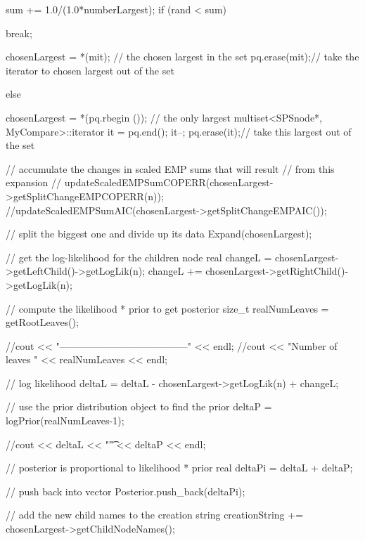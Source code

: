 \begin{DoxyCode}
{{{{{                    sum += 1.0/(1.0*numberLargest);
                    if (rand < sum) {

                        break;
                    }
                }
                chosenLargest = *(mit); // the chosen largest in the set
                pq.erase(mit);// take the iterator to chosen largest out of the
       set
            }

            else {

                chosenLargest = *(pq.rbegin ()); // the only largest
                multiset<SPSnode*, MyCompare>::iterator it = pq.end();
                it--;
                pq.erase(it);// take this largest out of the set
            }

            // accumulate the changes in scaled EMP sums that will result
            // from this expansion
            //
      updateScaledEMPSumCOPERR(chosenLargest->getSplitChangeEMPCOPERR(n));
            //updateScaledEMPSumAIC(chosenLargest->getSplitChangeEMPAIC());

            // split the biggest one and divide up its data
             Expand(chosenLargest);
             
        // get the log-likelihood for the children node 
        real changeL = chosenLargest->getLeftChild()->getLogLik(n);
        changeL += chosenLargest->getRightChild()->getLogLik(n);

        // compute the likelihood * prior to get posterior
        size_t realNumLeaves = getRootLeaves(); 
        
        //cout << "---------------------------------------" << endl;
        //cout << "Number of leaves " << realNumLeaves << endl;

        // log likelihood
        deltaL = deltaL - chosenLargest->getLogLik(n) + changeL; 

        // use the prior distribution object to find the prior 
        deltaP = logPrior(realNumLeaves-1);
        
        //cout << deltaL << "\t" << deltaP << endl;
        
        // posterior is proportional to likelihood * prior
        real deltaPi = deltaL + deltaP;
        
        // push back into vector
        Posterior.push_back(deltaPi);

            // add the new child names to the creation string
            creationString += chosenLargest->getChildNodeNames();

}}}
\end{DoxyCode}
